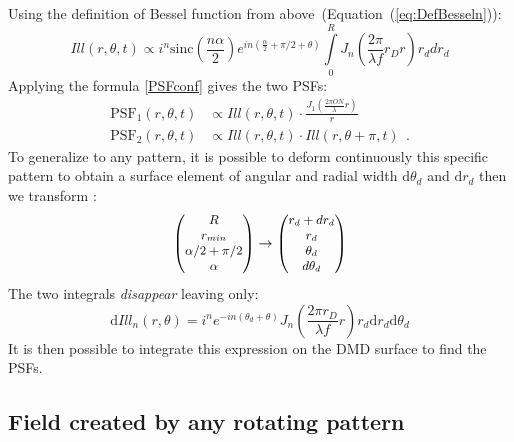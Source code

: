 \documentclass[%
reprint,
 amsmath,amssymb,
 aps,
]{revtex4-2}
\newcommand{\dd}{\mathrm{d}}
\begin{document}
\noindent Using the definition of Bessel function from above~(Equation~(\ref{eq:DefBesseln})):
\begin{equation}
     Ill(r,\theta,t)\propto i^n \textrm{sinc}\left(\frac{n\alpha}{2}\right)e^{in(\frac{\alpha}{2}+\pi/2+\theta)}\int \limits_{0}^{R} J_n\left(\frac{2 \pi}{\lambda f}r_D r\right) r_d dr_d
\end{equation}
Applying the formula \ref{PSFconf} gives the two PSFs:
\begin{align}
    \textrm{PSF}_{1}(r,\theta,t) &\propto Ill(r,\theta,t)\cdot \frac{J_{1}\left(\frac{2\pi ON }{\lambda}r\right)}{r} \label{PSF1eq}\\
   \textrm{PSF}_{2}(r,\theta,t) &\propto Ill(r,\theta,t)\cdot Ill(r,\theta+\pi,t) \label{PSF2eq} \ \ .
\end{align}
To generalize to any pattern, it is possible to deform continuously this specific pattern to obtain a surface element of angular and radial width $\dd \theta_d$ and $\dd r_d$ then we transform :
\begin{equation}
    \small{\begin{pmatrix} R  \\r_{min} \\ \alpha/2+\pi/2 \\\alpha \end{pmatrix} \to \begin{pmatrix} r_d+dr_d  \\ r_d \\ \theta_d \\ d\theta_d \end{pmatrix}}
\end{equation}
The two integrals \textit{disappear} leaving only:
\begin{equation}
    \dd Ill_n(r,\theta) = i^n e^{-in(\theta_d+\theta)} J_n\left(\frac{2 \pi r_D}{\lambda f}r\right)r_d \dd r_d \dd\theta_d 
\end{equation}
It is then possible to integrate this expression on the DMD surface to find the PSFs.
\subsection{Field created by any rotating pattern}
\end{document}

